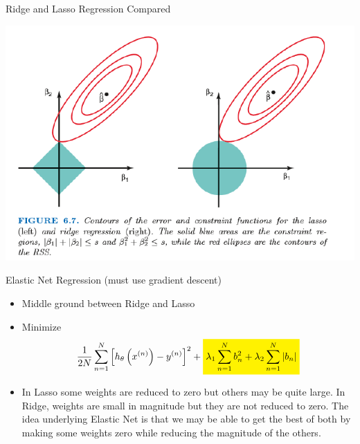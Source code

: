 \documentclass[11pt]{beamer}
\newcommand{\highlight}[1]{%
  \colorbox{yellow!100}{$\displaystyle#1$}}
\begin{document}
\begin{frame}{Ridge and Lasso Regression Compared}
\begin{center}
\includegraphics[scale=.55]{../05-pictures/lesson-2-1_pic_16.png} 
\end{center}
\end{frame}
\begin{frame}{Elastic Net Regression (must use gradient descent)}
	\begin{itemize}
		\item Middle ground between Ridge and Lasso
		\item Minimize
		\begin{equation}
		\frac{1}{2N} \sum\limits_{n=1}^N \left[h_\theta \left( x^{(n)} \right) - y ^{(n)}\right]^2 + \highlight{\lambda_1 \sum\limits_{n=1}^N b_n^2 + \lambda_2 \sum\limits_{n=1}^N \vert b_n \vert}
		\end{equation}
		\item In Lasso some weights are reduced to zero but others may be quite large. In Ridge, weights are small in magnitude but they are not reduced to zero. The idea underlying Elastic Net is that we may be able to get the best of both by making some weights zero while reducing the magnitude of the others.
	\end{itemize}
\end{frame}
\end{document}
